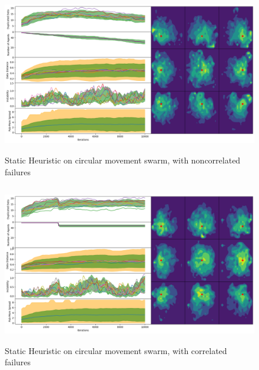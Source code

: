 \documentclass{UoYCSproject}
\begin{document}
\begin{figure}[htb]
\label{fig:circle_movement_non}
\begin{center}
\centering
\includegraphics[height=7cm]{"./Static_Heuristic/Circle_movement_non.png"}
\caption{Static Heuristic on circular movement swarm, with non\-correlated failures}
\end{center}
\end{figure}

\begin{figure}[htb]
\label{fig:circle_movement_con}
\begin{center}
\centering
\includegraphics[height=7cm]{"./Static_Heuristic/Circle_movement_concurrent.png"}
\caption{Static Heuristic on circular movement swarm, with correlated failures}
\end{center}
\end{figure}

\end{document}
